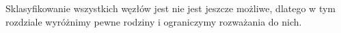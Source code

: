 Sklasyfikowanie wszystkich węzłów jest nie jest jeszcze możliwe, dlatego w tym rozdziale wyróżnimy pewne rodziny i ograniczymy rozważania do nich.
